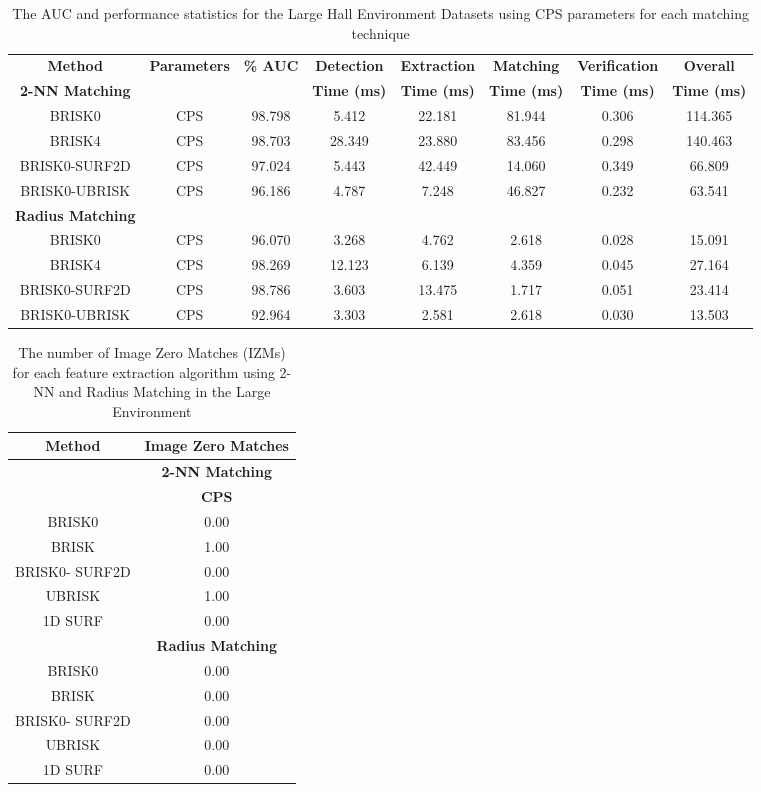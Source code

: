 \documentclass[11pt]{report}
\begin{document}
\begin{table}
\caption{The AUC and performance statistics for the Large Hall Environment
Datasets using CPS parameters for each matching technique}

\footnotesize
\begin{tabular}{|c|c|c|c|c|c|c|c|}
\hline 
\textbf{Method } & \textbf{Parameters} & \textbf{\% AUC} & \textbf{Detection} & \textbf{Extraction} & \textbf{Matching} & \textbf{Verification} & \textbf{Overall}\tabularnewline
\textbf{2-NN Matching} &  &  & \textbf{Time (ms)} & \textbf{Time (ms)} & \textbf{Time (ms)} & \textbf{Time (ms)} & \textbf{Time (ms)}\tabularnewline
\hline 
\hline 
BRISK0 & CPS & 98.798 & 5.412 & 22.181 & 81.944 & 0.306 & 114.365\tabularnewline
\hline 
BRISK4 & CPS & 98.703 & 28.349 & 23.880 & 83.456 & 0.298 & 140.463\tabularnewline
\hline 
BRISK0-SURF2D & CPS & 97.024 & 5.443 & 42.449 & 14.060 & 0.349 & 66.809\tabularnewline
\hline 
BRISK0-UBRISK & CPS & 96.186 & 4.787 & 7.248 & 46.827 & 0.232 & 63.541\tabularnewline
\hline 
\textbf{Radius Matching} &  &  &  &  &  &  & \tabularnewline
\hline 
BRISK0 & CPS & 96.070 & 3.268 & 4.762 & 2.618 & 0.028 & 15.091\tabularnewline
\hline 
BRISK4 & CPS & 98.269 & 12.123 & 6.139 & 4.359 & 0.045 & 27.164\tabularnewline
\hline 
BRISK0-SURF2D & CPS & 98.786 & 3.603 & 13.475 & 1.717 & 0.051 & 23.414\tabularnewline
\hline 
BRISK0-UBRISK & CPS & 92.964 & 3.303 & 2.581 & 2.618 & 0.030 & 13.503\tabularnewline
\hline 
\end{tabular}
\label{app:lh_times}
\end{table}



\begin{table}
\caption{The number of Image Zero Matches (IZMs) for each feature extraction
algorithm using 2-NN and Radius Matching in the Large Environment}
\begin{tabular}{|c|c|}
\hline 
\textbf{Method} & \multicolumn{1}{c|}{\textbf{Image Zero Matches}}\tabularnewline
\hline 
 & \multicolumn{1}{c|}{\textbf{2-NN Matching}}\tabularnewline
\hline 
 & \textbf{CPS}\tabularnewline
\hline 
\hline 
BRISK0 & 0.00\tabularnewline
\hline 
BRISK & 1.00\tabularnewline
\hline 
BRISK0- SURF2D & 0.00\tabularnewline
\hline 
UBRISK & 1.00\tabularnewline
\hline 
1D SURF & 0.00\tabularnewline
\hline 
 & \multicolumn{1}{c|}{\textbf{Radius Matching}}\tabularnewline
\hline 
BRISK0 & 0.00\tabularnewline
\hline 
BRISK & 0.00\tabularnewline
\hline 
BRISK0- SURF2D & 0.00\tabularnewline
\hline 
UBRISK & 0.00\tabularnewline
\hline 
1D SURF & 0.00\tabularnewline
\hline 
\end{tabular}
\label{app:lh_izm}
\end{table}
\end{document}
